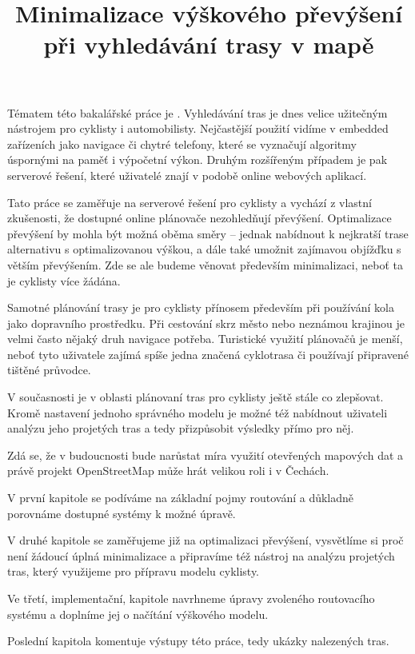 \documentclass[thesis=B,czech]{FITthesis}[2012/06/26]
\title{Minimalizace výškového převýšení při vyhledávání trasy v mapě}
\begin{document}


\begin{introduction}

Tématem této bakalářské práce je . Vyhledávání tras je dnes velice užitečným nástrojem pro cyklisty i automobilisty. Nejčastější použití vidíme v embedded zařízeních jako navigace či chytré telefony, které se vyznačují algoritmy úspornými na paměť i výpočetní výkon. Druhým rozšířeným případem je pak serverové řešení, které uživatelé znají v podobě online webových aplikací.

Tato práce se zaměřuje na serverové řešení pro cyklisty a vychází z vlastní zkušenosti, že dostupné online plánovače nezohledňují převýšení. Optimalizace převýšení by mohla být možná oběma směry – jednak nabídnout k nejkratší trase alternativu s optimalizovanou výškou, a dále také umožnit zajímavou objížďku s větším převýšením. Zde se ale budeme věnovat především minimalizaci, neboť ta je cyklisty více žádána.

Samotné plánování trasy je pro cyklisty přínosem především při používání kola jako dopravního prostředku. Při cestování skrz město nebo neznámou krajinou je velmi často nějaký druh navigace potřeba. Turistické využití plánovačů je menší, neboť tyto uživatele zajímá spíše jedna značená cyklotrasa či používají připravené tištěné průvodce.

V současnosti je v oblasti plánovaní tras pro cyklisty ještě stále co zlepšovat. Kromě nastavení jednoho správného modelu je možné též nabídnout uživateli analýzu jeho projetých tras a tedy přizpůsobit výsledky přímo pro něj.

Zdá se, že v budoucnosti bude narůstat míra využití otevřených mapových dat a právě projekt OpenStreetMap může hrát velikou roli i v Čechách. 

V první kapitole se podíváme na základní pojmy routování a důkladně porovnáme dostupné systémy k možné úpravě.

V druhé kapitole se zaměřujeme již na optimalizaci převýšení, vysvětlíme si proč není žádoucí úplná minimalizace a připravíme též nástroj na analýzu projetých tras, který využijeme pro přípravu modelu cyklisty.

Ve třetí, implementační, kapitole navrhneme úpravy zvoleného routovacího systému a doplníme jej o načítání výškového modelu.

Poslední kapitola komentuje výstupy této práce, tedy ukázky nalezených tras.



\end{introduction}
\end{document}
